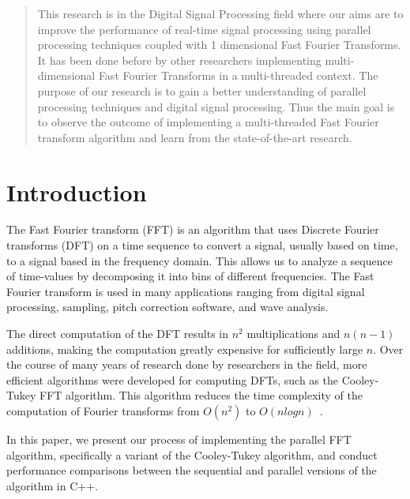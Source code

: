 \documentclass[journal]{IEEEtran}
\begin{document}
\maketitle

\begin{abstract}
This research is in the Digital Signal Processing field 
where our aims are to improve the performance of real-time signal 
processing using parallel processing techniques coupled with 1 
dimensional Fast Fourier Transforms. 
It has been done before by other researchers implementing 
multi-dimensional Fast Fourier Transforms in a multi-threaded context. 
The purpose of our research is to gain a better understanding of 
parallel processing techniques and digital signal processing. 
Thus the main goal is to observe the outcome of implementing a 
multi-threaded Fast Fourier transform algorithm and learn from the 
state-of-the-art research.
\end{abstract}

\section{Introduction}
	\par {The Fast Fourier transform (FFT) is an algorithm that uses Discrete Fourier transforms
	 (DFT) on a time sequence to convert a signal, usually based on time, to a signal based in the
	 frequency domain. This allows us to analyze a sequence of time-values by decomposing it into
	 bins of different frequencies. The Fast Fourier transform is used in many applications ranging
	 from digital signal processing, sampling, pitch correction software, and wave analysis.}

	\par {The direct computation of the DFT results in $n^2$ multiplications and $n(n-1)$ additions,
	making the computation greatly expensive for sufficiently large $n$.  Over the course of many years
	of research done by researchers in the field, more efficient algorithms were developed for computing DFTs,
	such as the Cooley-Tukey FFT algorithm. This algorithm reduces the time complexity of the computation of
	Fourier transforms from $O(n^2)$ to $O(nlogn)$~\cite{Xiang}}.

	\par {In this paper, we present our process of implementing the parallel FFT algorithm, specifically
	a variant of the Cooley-Tukey algorithm, and conduct performance comparisons between the sequential and 
	parallel versions of the algorithm in C++.}
\end{document}
